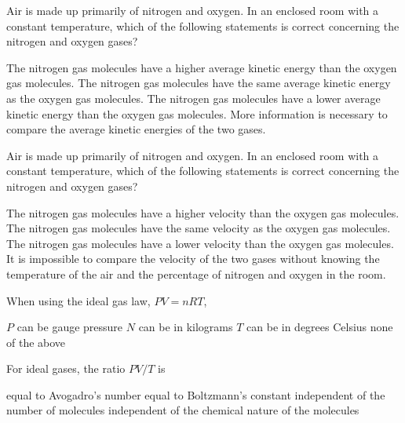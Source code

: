 \documentclass{../../../oss-ap12ibhl}
\begin{document}
\genheader


\begin{questions}
  \question Air is made up primarily of nitrogen and oxygen. In an enclosed room
  with a constant temperature, which of the following statements is
  correct concerning the nitrogen and oxygen gases?
  \begin{choices}
    \choice The nitrogen gas molecules have a higher average kinetic energy than
    the oxygen gas molecules.
    \choice The nitrogen gas molecules have the same average kinetic energy as
    the oxygen gas molecules.
    \choice The nitrogen gas molecules have a lower average kinetic energy than
    the oxygen gas molecules.
    \choice More information is necessary to compare the average kinetic
    energies of the two gases.
  \end{choices}
  \vspace{.7in}
    
  \question Air is made up primarily of nitrogen and oxygen. In an enclosed room
  with a constant temperature, which of the following statements is correct
  concerning the nitrogen and oxygen gases?
  \begin{choices}
    \choice The nitrogen gas molecules have a higher velocity than the oxygen
    gas molecules.
    \choice The nitrogen gas molecules have the same velocity as the oxygen gas
    molecules.
    \choice The nitrogen gas molecules have a lower velocity than the oxygen gas
    molecules.
    \choice It is impossible to compare the velocity of the two gases without
    knowing the temperature of the air and the percentage of nitrogen and
    oxygen in the room.
  \end{choices}
  \vspace{.7in}
    
  \question When using the ideal gas law, $PV=nRT$,
  \begin{choices}
    \choice $P$ can be gauge pressure
    \choice $N$ can be in kilograms
    \choice $T$ can be in degrees Celsius
    \choice none of the above
  \end{choices}

  \question For ideal gases, the ratio $PV/T $ is
  \begin{choices}
    \choice equal to Avogadro's number
    \choice equal to Boltzmann's constant
    \choice independent of the number of molecules
    \choice independent of the chemical nature of the molecules
  \end{choices}


\end{questions}
\end{document}
